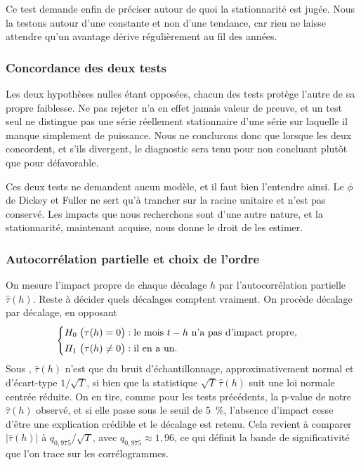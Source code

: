 Ce test demande enfin de préciser autour de quoi la stationnarité est jugée.
Nous la testons autour d'une constante et non d'une tendance, car rien ne
laisse attendre qu'un avantage dérive régulièrement au fil des années.

\subsubsection*{Concordance des deux tests}

Les deux hypothèses nulles étant opposées, chacun des tests protège l'autre de
sa propre faiblesse. Ne pas rejeter n'a en effet jamais valeur de preuve, et un
test seul ne distingue pas une série réellement stationnaire d'une série sur
laquelle il manque simplement de puissance. Nous ne conclurons donc que
lorsque les deux concordent, et s'ils divergent, le diagnostic sera tenu pour
non concluant plutôt que pour défavorable.

Ces deux tests ne demandent aucun modèle, et il faut bien l'entendre ainsi. Le
\(\phi\) de Dickey et Fuller ne sert qu'à trancher sur la racine unitaire et
n'est pas conservé. Les impacts que nous recherchons sont d'une autre nature,
et la stationnarité, maintenant acquise, nous donne le droit de les estimer.

\subsubsection*{Autocorrélation partielle et choix de l'ordre}

On mesure l'impact propre de chaque décalage \(h\) par l'autocorrélation
partielle \(\hat\tau(h)\). Reste à décider quels décalages comptent vraiment.
On procède décalage par décalage, en opposant
\[
  \begin{cases}
    H_0 \;\bigl(\tau(h) = 0\bigr) : \text{le mois } t-h \text{ n'a pas d'impact propre,}\\[2pt]
    H_1 \;\bigl(\tau(h) \neq 0\bigr) : \text{il en a un.}
  \end{cases}
\]
Sous \Hzero{}, \(\hat\tau(h)\) n'est que du bruit d'échantillonnage,
approximativement normal et d'écart-type \(1/\sqrt{T}\), si bien que la
statistique \(\sqrt{T}\,\hat\tau(h)\) suit une loi normale centrée réduite. On
en tire, comme pour les tests précédents, la p-value de notre \(\hat\tau(h)\)
observé, et si elle passe sous le seuil de 5~\%, l'absence d'impact cesse
d'être une explication crédible et le décalage est retenu. Cela revient à
comparer \(\bigl|\hat\tau(h)\bigr|\) à \(q_{0{,}975}/\sqrt{T}\), avec
\(q_{0{,}975} \approx 1{,}96\), ce qui définit la bande de significativité que
l'on trace sur les corrélogrammes.

